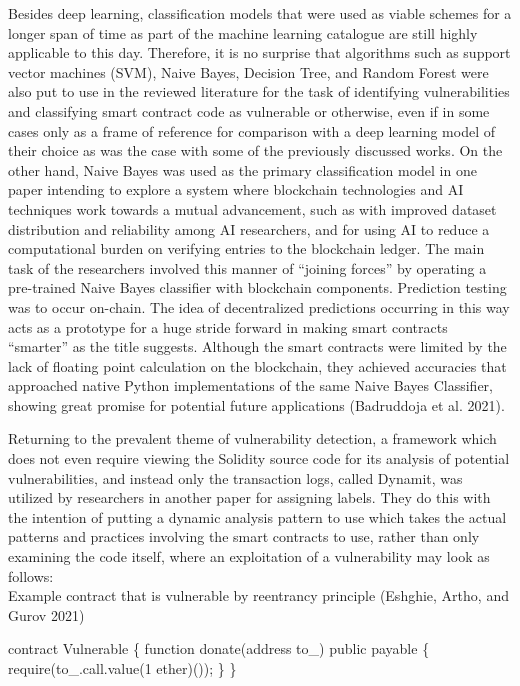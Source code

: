 \documentclass[
  11pt,
]{article}
\newenvironment{Shaded}{\begin{snugshade}}{\end{snugshade}}
\newcommand{\AttributeTok}[1]{\textcolor[rgb]{0.40,0.45,0.13}{#1}}
\newcommand{\DecValTok}[1]{\textcolor[rgb]{0.68,0.00,0.00}{#1}}
\newcommand{\FunctionTok}[1]{\textcolor[rgb]{0.28,0.35,0.67}{#1}}
\newcommand{\KeywordTok}[1]{\textcolor[rgb]{0.00,0.23,0.31}{#1}}
\newcommand{\NormalTok}[1]{\textcolor[rgb]{0.00,0.23,0.31}{#1}}
\newcommand{\OperatorTok}[1]{\textcolor[rgb]{0.37,0.37,0.37}{#1}}
\newcommand{\PreprocessorTok}[1]{\textcolor[rgb]{0.68,0.00,0.00}{#1}}
\begin{document}
Besides deep learning, classification models that were used as viable
schemes for a longer span of time as part of the machine learning
catalogue are still highly applicable to this day. Therefore, it is no
surprise that algorithms such as support vector machines (SVM), Naive
Bayes, Decision Tree, and Random Forest were also put to use in the
reviewed literature for the task of identifying vulnerabilities and
classifying smart contract code as vulnerable or otherwise, even if in
some cases only as a frame of reference for comparison with a deep
learning model of their choice as was the case with some of the
previously discussed works. On the other hand, Naive Bayes was used as
the primary classification model in one paper intending to explore a
system where blockchain technologies and AI techniques work towards a
mutual advancement, such as with improved dataset distribution and
reliability among AI researchers, and for using AI to reduce a
computational burden on verifying entries to the blockchain ledger. The
main task of the researchers involved this manner of ``joining forces''
by operating a pre-trained Naive Bayes classifier with blockchain
components. Prediction testing was to occur on-chain. The idea of
decentralized predictions occurring in this way acts as a prototype for
a huge stride forward in making smart contracts ``smarter'' as the title
suggests. Although the smart contracts were limited by the lack of
floating point calculation on the blockchain, they achieved accuracies
that approached native Python implementations of the same Naive Bayes
Classifier, showing great promise for potential future applications
(Badruddoja et al. 2021).

Returning to the prevalent theme of vulnerability detection, a framework
which does not even require viewing the Solidity source code for its
analysis of potential vulnerabilities, and instead only the transaction
logs, called Dynamit, was utilized by researchers in another paper for
assigning labels. They do this with the intention of putting a dynamic
analysis pattern to use which takes the actual patterns and practices
involving the smart contracts to use, rather than only examining the
code itself, where an exploitation of a vulnerability may look as
follows:\\

Example contract that is vulnerable by reentrancy principle (Eshghie,
Artho, and Gurov 2021)

\begin{Shaded}
\begin{Highlighting}[]
\NormalTok{contract Vulnerable \{}
  \KeywordTok{function} \FunctionTok{donate}\NormalTok{(address to\_) }\KeywordTok{public}\NormalTok{ payable}
\NormalTok{  \{}
    \PreprocessorTok{require}\NormalTok{(to\_}\OperatorTok{.}\AttributeTok{call}\OperatorTok{.}\FunctionTok{value}\NormalTok{(}\DecValTok{1}\NormalTok{ ether)())}\OperatorTok{;}
\NormalTok{  \}}
\NormalTok{\}}
\end{Highlighting}
\end{Shaded}
\end{document}
